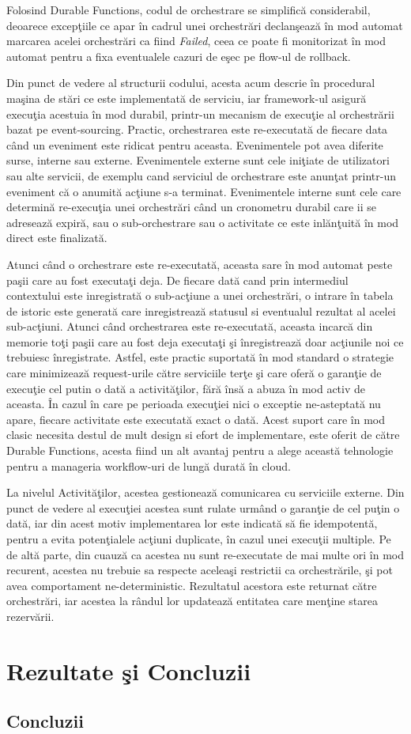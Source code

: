 \documentclass[a4paper,12pt]{report}
\begin{document}
\par Folosind Durable Functions, codul de orchestrare se simplifică considerabil, deoarece excepţiile ce apar în cadrul unei orchestrări declanşează în mod automat marcarea acelei orchestrări ca fiind \emph{Failed}, ceea ce poate fi monitorizat în mod automat pentru a fixa eventualele cazuri de eşec pe flow-ul de rollback. 
\par Din punct de vedere al structurii codului, acesta acum descrie în procedural maşina de stări ce este implementată de serviciu, iar framework-ul asigură execuţia acestuia în mod durabil, printr-un mecanism de execuţie al orchestrării bazat pe event-sourcing. Practic, orchestrarea este re-executată de fiecare data când un eveniment este ridicat pentru aceasta. Evenimentele pot avea diferite surse, interne sau externe. Evenimentele externe sunt cele iniţiate de utilizatori sau alte servicii, de exemplu cand serviciul de orchestrare este anunţat printr-un eveniment că o anumită acţiune s-a terminat. Evenimentele interne sunt cele care determină re-execuţia unei orchestrări când un cronometru durabil care ii se adresează expiră, sau o sub-orchestrare sau o activitate ce este inlănţuită în mod direct este finalizată. 
\par Atunci când o orchestrare este re-executată, aceasta sare în mod automat peste paşii care au fost executaţi deja. De fiecare dată cand prin intermediul contextului este inregistrată o sub-acţiune a unei orchestrări, o intrare în tabela de istoric este generată care inregistrează statusul si eventualul rezultat al acelei sub-acţiuni. Atunci când orchestrarea este re-executată, aceasta incarcă din memorie toţi paşii care au fost deja executaţi şi înregistrează doar acţiunile noi ce trebuiesc înregistrate. Astfel, este practic suportată în mod standard o strategie care minimizează request-urile către serviciile terţe şi care oferă o garanţie de execuţie cel putin o dată a activităţilor, fără însă a abuza în mod activ de aceasta. În cazul în care pe perioada execuţiei nici o exceptie ne-asteptată nu apare, fiecare activitate este executată exact o dată. Acest suport care în mod clasic necesita destul de mult design si efort de implementare, este oferit de către Durable Functions, acesta fiind un alt avantaj pentru a alege această tehnologie pentru a manageria workflow-uri de lungă durată în cloud. 
\par La nivelul Activităţilor, acestea gestionează comunicarea cu serviciile externe. Din punct de vedere al execuţiei acestea sunt rulate urmând o garanţie de cel puţin o dată, iar din acest motiv implementarea lor este indicată să fie idempotentă, pentru a evita potenţialele acţiuni duplicate, în cazul unei execuţii multiple. Pe de altă parte, din cuauză ca acestea nu sunt re-executate de mai multe ori în mod recurent, acestea nu trebuie sa respecte aceleaşi restrictii ca orchestrările, şi pot avea comportament ne-deterministic. Rezultatul acestora este returnat către orchestrări, iar acestea la rândul lor updatează entitatea care menţine starea rezervării. 

\chapter {Rezultate şi Concluzii}

\section{Concluzii}


\listoffigures
\listoftables

\end{document}
